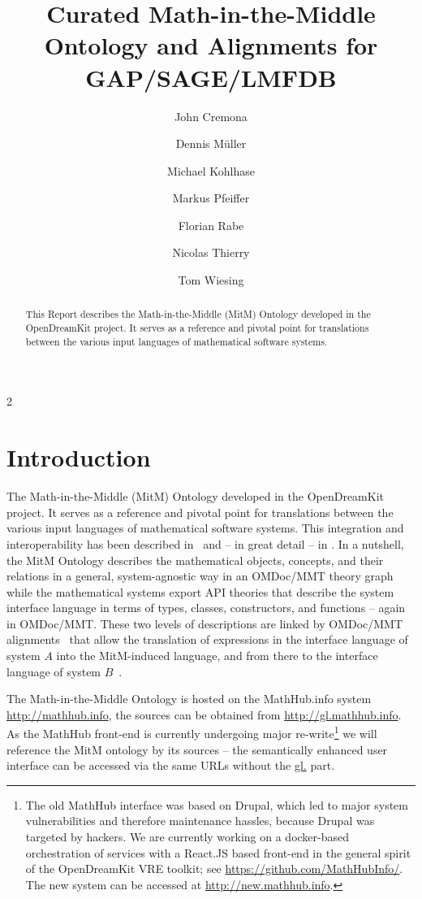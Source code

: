 \documentclass[book]{deliverablereport}
\title{Curated Math-in-the-Middle Ontology and Alignments for GAP/SAGE/LMFDB}
\author{John Cremona}
\author{Dennis M\"uller}
\author{Michael Kohlhase}
\author{Markus Pfeiffer}
\author{Florian Rabe}
\author{Nicolas Thierry}
\author{Tom Wiesing}
\begin{document}
\begin{abstract}
  This Report describes the Math-in-the-Middle (MitM) Ontology developed in the
  OpenDreamKit project. It serves as a reference and pivotal point for translations
  between the various input languages of mathematical software systems. 
\end{abstract}
\maketitle
\newpage\setcounter{tocdepth}2\tableofcontents\newpage

\section{Introduction}

The Math-in-the-Middle (MitM) Ontology developed in the OpenDreamKit project. It serves as
a reference and pivotal point for translations between the various input languages of
mathematical software systems. This integration and interoperability has been described
in~\cite{DehKohKon:iop16,WieKohRab:vtuimkb17,KohMuePfe:kbimss17} and -- in great detail --
in \cite{ODK-D6.5}. In a nutshell, the MitM Ontology describes the mathematical objects,
concepts, and their relations in a general, system-agnostic way in an OMDoc/MMT theory
graph while the mathematical systems export API theories that describe the system
interface language in terms of types, classes, constructors, and functions -- again in
OMDoc/MMT. These two levels of descriptions are linked by OMDoc/MMT
alignments~\cite{MueGauKal:cacfms17} that allow the translation of expressions in the
interface language of system $A$ into the MitM-induced language, and from there to the
interface language of system $B$~\cite{MueRoYuRa:abtafs17}.

The Math-in-the-Middle Ontology is hosted on the MathHub.info system
\url{http://mathhub.info}, the sources can be obtained from
\url{http://gl.mathhub.info}. As the MathHub front-end is currently undergoing major
re-write\footnote{The old MathHub interface was based on Drupal, which led to major system
  vulnerabilities and therefore maintenance hassles, because Drupal was targeted by
  hackers. We are currently working on a docker-based orchestration of services with a
  React.JS based front-end in the general spirit of the OpenDreamKit VRE toolkit; see
  \url{https://github.com/MathHubInfo/}. The new system can be accessed at
  \url{http://new.mathhub.info}.} we will reference the MitM ontology by its sources --
the semantically enhanced user interface can be accessed via the same URLs without the
\url{gl.} part.
\end{document}
